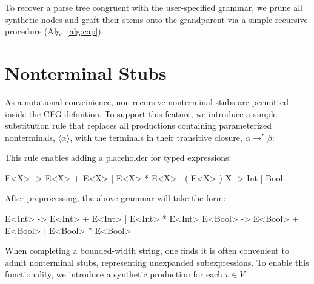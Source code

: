 \documentclass[sigplan,nonacm]{acmart}\settopmatter{printfolios=false,printccs=false,printacmref=false}
\begin{document}
\noindent To recover a parse tree congruent with the user-specified grammar, we prune all synthetic nodes and graft their stems onto the grandparent via a simple recursive procedure (Alg.~\ref{alg:cap}).%

\section{Nonterminal Stubs}

\noindent As a notational conveinience, non-recursive nonterminal stubs are permitted inside the CFG definition. To support this feature, we introduce a simple substitution rule that replaces all productions containing parameterized nonterminals, $\langle\alpha\rangle$, with the terminals in their transitive closure, $\alpha \rightarrow^* \beta$:

\begin{figure}[H]
\begin{prooftree}
\end{prooftree}
\end{figure}

\noindent This rule enables adding a placeholder for typed expressions:

\begin{tidyinput}
E<X> -> E<X> + E<X> | E<X> * E<X> | ( E<X> )
X -> Int | Bool
\end{tidyinput}

\noindent After preprocessing, the above grammar will take the form:

\begin{tidyinput}
E<Int> -> E<Int> + E<Int> | E<Int> * E<Int>
E<Bool> -> E<Bool> + E<Bool> | E<Bool> * E<Bool>
\end{tidyinput}

When completing a bounded-width string, one finds it is often convenient to admit nonterminal stubs, representing unexpanded subexpressions. To enable this functionality, we introduce a synthetic production for each $v \in V$:

\begin{prooftree}
\end{prooftree}
\end{document}
